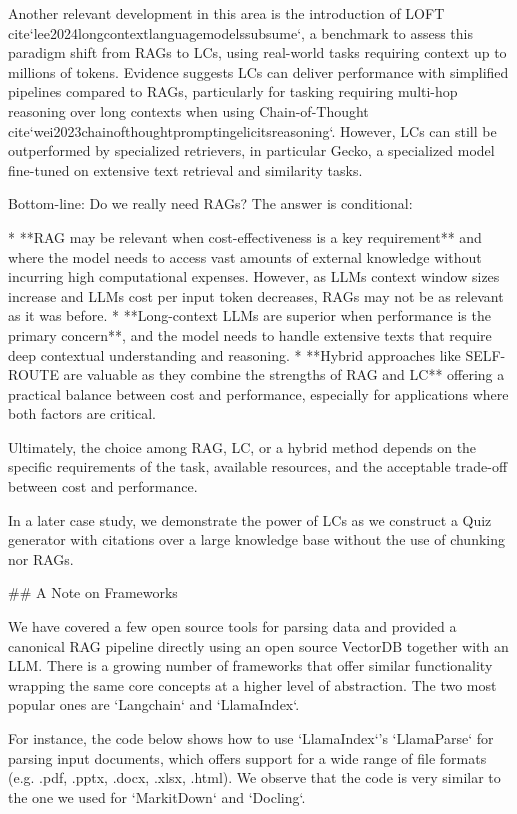 {{Another relevant development in this area is the introduction of LOFT {cite}`lee2024longcontextlanguagemodelssubsume`, a benchmark to assess this paradigm shift from RAGs to LCs, using real-world tasks requiring context up to millions of tokens. Evidence suggests LCs can deliver performance with simplified pipelines compared to RAGs, particularly for tasking requiring multi-hop reasoning over long contexts when using Chain-of-Thought {cite}`wei2023chainofthoughtpromptingelicitsreasoning`. However, LCs can still be outperformed by specialized retrievers, in particular Gecko, a specialized model fine-tuned on extensive text retrieval and similarity tasks.

Bottom-line: Do we really need RAGs? The answer is conditional:

*   **RAG may be relevant when cost-effectiveness is a key requirement** and where the model needs to access vast amounts of external knowledge without incurring high computational expenses. However, as LLMs context window sizes increase and LLMs cost per input token decreases, RAGs may not be as relevant as it was before.
*   **Long-context LLMs are superior when performance is the primary concern**, and the model needs to handle extensive texts that require deep contextual understanding and reasoning.
*   **Hybrid approaches like SELF-ROUTE are valuable as they combine the strengths of RAG and LC** offering a practical balance between cost and performance, especially for applications where both factors are critical.

Ultimately, the choice among RAG, LC, or a hybrid method depends on the specific requirements of the task, available resources, and the acceptable trade-off between cost and performance.

In a later case study, we demonstrate the power of LCs as we construct a Quiz generator with citations over a large knowledge base without the use of chunking nor RAGs.


## A Note on Frameworks

We have covered a few open source tools for parsing data and provided a canonical RAG pipeline directly using an open source VectorDB together with an LLM. There is a growing number of frameworks that offer similar functionality wrapping the same core concepts at a higher level of abstraction. The two most popular ones are `Langchain` and `LlamaIndex`. 

For instance, the code below shows how to use `LlamaIndex`'s `LlamaParse` for parsing input documents, which offers support for a wide range of file formats (e.g. .pdf, .pptx, .docx, .xlsx, .html). We observe that the code is very similar to the one we used for `MarkitDown` and `Docling`.

}}
